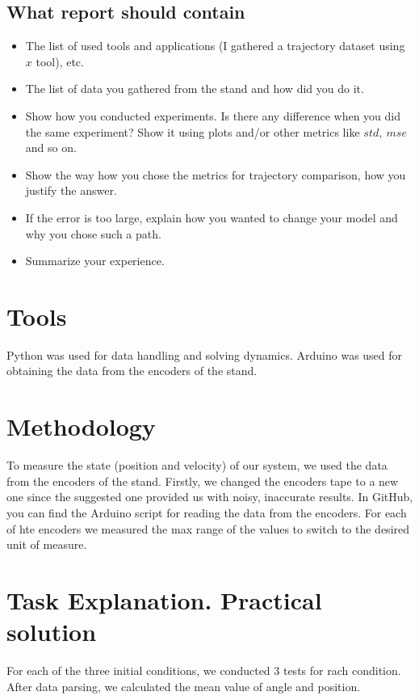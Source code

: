 \documentclass{article}
\begin{document}
\subsection{What report should contain}
\begin{itemize}
\item The list of used tools and applications (I gathered a trajectory dataset using $x$ tool), etc.
\item The list of data you gathered from the stand and how did you do it.
\item Show how you conducted experiments. Is there any difference when you did the same experiment? Show it using plots and/or other metrics like $std,\ mse$ and so on.
\item Show the way how you chose the metrics for trajectory comparison, how you justify the answer.
\item If the error is too large, explain how you wanted to change your model and why you chose such a path.
\item Summarize your experience.
\end{itemize}

\section{Tools}
Python was used for data handling and solving dynamics.
Arduino was used for obtaining the data from the encoders of the stand.

\section{Methodology}
To measure the state (position and velocity) of our system, we used the data from the encoders of the stand. 
Firstly, we changed the encoders tape to a new one since the suggested one provided us with noisy, inaccurate results.
In GitHub, you can find the Arduino script for reading the data from the encoders.
For each of hte encoders we measured the max range of the values to switch to the desired unit of measure. 

\section{Task Explanation. Practical solution}

For each of the three initial conditions, we conducted 3 tests for rach condition. 
After data parsing, we calculated the mean value of angle and position. 
\end{document}
